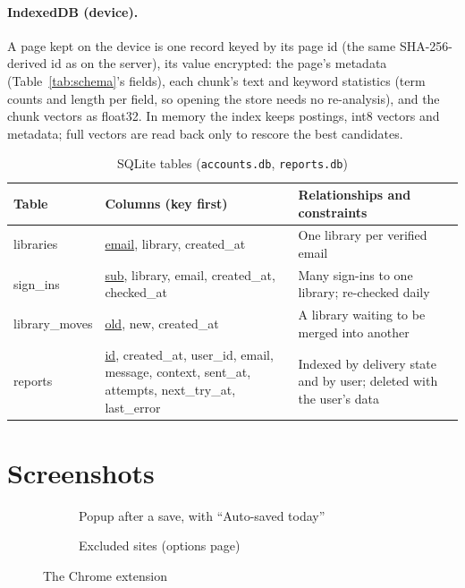 \paragraph{IndexedDB (device).} A page kept on the device is one record keyed
by its page id (the same SHA-256-derived id as on the server), its value
encrypted: the page's metadata (Table~\ref{tab:schema}'s fields), each
chunk's text and keyword statistics (term counts and length per field, so
opening the store needs no re-analysis), and the chunk vectors as float32. In
memory the index keeps postings, int8 vectors and metadata; full vectors are
read back only to rescore the best candidates.

\begin{table}[H]
\centering
\footnotesize
\begin{tabularx}{\textwidth}{>{\ttfamily}p{} L L}
\toprule
\textrm{\textbf{Table}} & \textbf{Columns (key first)} & \textbf{Relationships and constraints} \\
\midrule
libraries & \underline{email}, library, created\_at & One library per verified email \\
sign\_ins & \underline{sub}, library, email, created\_at, checked\_at & Many sign-ins to one library; re-checked daily \\
library\_moves & \underline{old}, new, created\_at & A library waiting to be merged into another \\
reports & \underline{id}, created\_at, user\_id, email, message, context, sent\_at, attempts, next\_try\_at, last\_error & Indexed by delivery state and by user; deleted with the user's data \\
\bottomrule
\end{tabularx}
\caption{SQLite tables (\texttt{accounts.db}, \texttt{reports.db})}
\label{tab:sqlite}
\end{table}

\section{Screenshots}

\begin{figure}[H]
\centering
\begin{subfigure}[b]{0.52\textwidth}
  \centering
  \caption{Popup after a save, with ``Auto-saved today''}
\end{subfigure}\hfill
\begin{subfigure}[b]{0.44\textwidth}
  \centering
  \caption{Excluded sites (options page)}
\end{subfigure}
\caption{The Chrome extension}
\label{fig:extension}
\end{figure}

